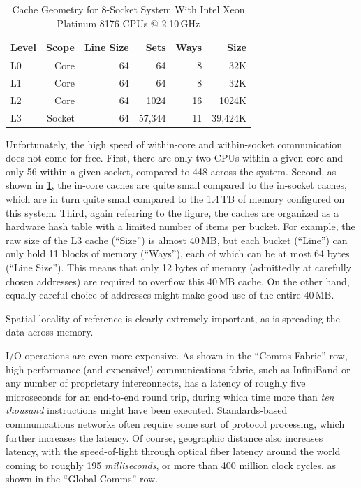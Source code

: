\begin{table}
\renewcommand*{\arraystretch}{1.1}
\centering\small
\begin{tabular}{lrrrrr}
	\toprule
	Level &  Scope & Line Size &   Sets & Ways &    Size \\
	\midrule
	L0    &   Core &        64 &     64 &    8 &     32K \\
	L1    &   Core &        64 &     64 &    8 &     32K \\
	L2    &   Core &        64 &   1024 &   16 &   1024K \\
	L3    & Socket &        64 & 57,344 &   11 & 39,424K \\
	\bottomrule
\end{tabular}
\caption{Cache Geometry for 8-Socket System With Intel Xeon Platinum 8176 CPUs @ 2.10\,GHz}
\label{tab:cpu:Cache Geometry for 8-Socket System With Intel Xeon Platinum 8176 CPUs @ 2.10GHz}
\end{table}

Unfortunately, the high speed of within-core and within-socket communication
does not come for free.
First, there are only two CPUs within a given core and only 56 within
a given socket, compared to 448 across the system.
Second, as shown in
\cref{tab:cpu:Cache Geometry for 8-Socket System With Intel Xeon Platinum 8176 CPUs @ 2.10GHz},
the in-core caches are quite small compared to the in-socket caches, which
are in turn quite small compared to the 1.4\,TB of memory configured on
this system.
Third, again referring to the figure, the caches are organized as
a hardware hash table with a limited number of items per bucket.
For example, the raw size of the L3 cache (``Size'') is almost 40\,MB, but each
bucket (``Line'') can only hold 11 blocks of memory (``Ways''), each
of which can be at most 64 bytes (``Line Size'').
This means that only 12 bytes of memory (admittedly at carefully chosen
addresses) are required to overflow this 40\,MB cache.
On the other hand, equally careful choice of addresses might make good
use of the entire 40\,MB.

Spatial locality of reference is clearly extremely important, as is
spreading the data across memory.

I/O operations are even more expensive.
As shown in the ``Comms Fabric'' row,
high performance (and expensive!) communications fabric, such as
InfiniBand or any number of proprietary interconnects, has a latency
of roughly five microseconds for an end-to-end round trip, during which
time more than \emph{ten thousand} instructions might have been executed.
Standards-based communications networks often require some sort of
protocol processing, which further increases the latency.
Of course, geographic distance also increases latency, with the
speed-of-light through optical fiber latency around the world coming to
roughly 195 \emph{milliseconds}, or more than 400 million clock
cycles, as shown in the ``Global Comms'' row.

